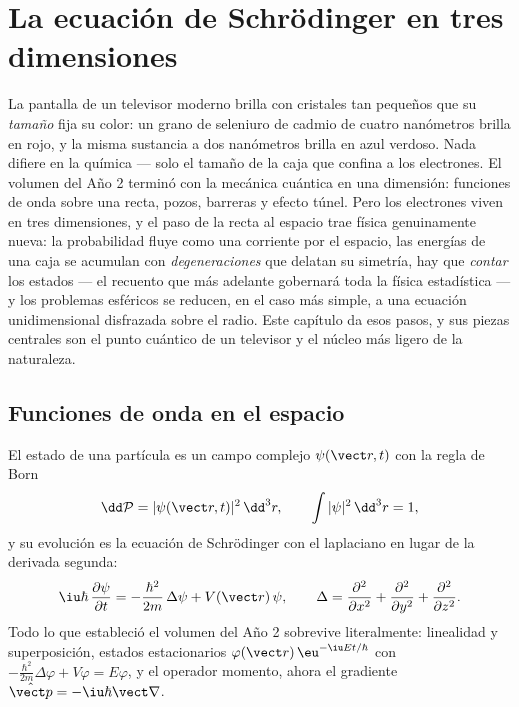 \chapter{La ecuación de Schrödinger en tres dimensiones}\label{ch:b3:schrodinger-three-dimensions}

La pantalla de un televisor moderno brilla con cristales tan pequeños que su
\emph{tamaño} fija su color: un grano de seleniuro de cadmio de cuatro
nanómetros brilla en rojo, y la misma sustancia a dos nanómetros brilla en
azul verdoso. Nada difiere en la química --- solo el tamaño de la caja que
confina a los electrones. El volumen del Año 2 terminó con la mecánica
cuántica en una dimensión: funciones de onda sobre una recta, pozos,
barreras y efecto túnel. Pero los electrones viven en tres dimensiones, y el
paso de la recta al espacio trae física genuinamente nueva: la probabilidad
fluye como una corriente por el espacio, las energías de una caja se
acumulan con \emph{degeneraciones} que delatan su simetría, hay que
\emph{contar} los estados --- el recuento que más adelante gobernará toda la
física estadística --- y los problemas esféricos se reducen, en el caso más
simple, a una ecuación unidimensional disfrazada sobre el radio. Este
capítulo da esos pasos, y sus piezas centrales son el punto cuántico de un
televisor y el núcleo más ligero de la naturaleza.

\section{Funciones de onda en el espacio}

\begin{definition}\label{def:b3:schrodinger-three-dimensions:psi3d}
El estado de una partícula es un campo complejo $\psi(\vect r, t)$ con la
regla de Born
\[
\dd\mathcal P = |\psi(\vect r, t)|^2\,\dd^3r , \qquad
\int|\psi|^2\,\dd^3r = 1 ,
\]
y su evolución es la ecuación de Schrödinger con el laplaciano en lugar de
la derivada segunda:
\[
\iu\hbar\,\frac{\partial\psi}{\partial t}
 = -\frac{\hbar^2}{2m}\,\Delta\psi + V(\vect r)\,\psi ,
\qquad
\Delta = \frac{\partial^2}{\partial x^2} +
\frac{\partial^2}{\partial y^2} + \frac{\partial^2}{\partial z^2} .
\]
Todo lo que estableció el volumen del Año 2 sobrevive literalmente:
linealidad y superposición, estados estacionarios
$\varphi(\vect r)\,\eu^{-\iu Et/\hbar}$ con
$-\tfrac{\hbar^2}{2m}\Delta\varphi + V\varphi = E\varphi$, y el operador
momento, ahora el gradiente $\hat{\vect p} =
-\iu\hbar\vect\nabla$.
\end{definition}

